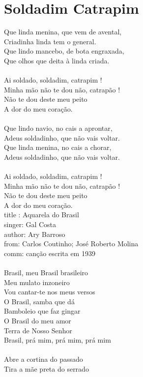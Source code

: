\documentclass{article}
\begin{document}
\section{ Soldadim Catrapim}
Que linda menina, que vem de avental,\\
Criadinha linda tem o general.\\
Que lindo mancebo, de bota engraxada,\\
Que olhos que deita à linda criada.\\
\\
Ai soldado, soldadim, catrapim !\\
Minha mão não te dou não, catrapão !\\
Não te dou deste meu peito\\
A dor do meu coração.\\
\\
Que lindo navio, no cais a aprontar,\\
Adeus soldadinho, que não vais voltar.\\
Que linda menina, no cais a chorar,\\
Adeus soldadinho, que não vais voltar.\\
\\
Ai soldado, soldadim, catrapim !\\
Minha mão não te dou não, catrapão !\\
Não te dou deste meu peito\\
A dor do meu coração.\\
title : Aquarela do Brasil \\
singer: Gal Costa\\
author: Ary Barroso\\
from: Carlos Coutinho; José Roberto Molina\\
comm: canção escrita em 1939 \\
\\
Brasil, meu Brasil brasileiro \\
Meu mulato inzoneiro \\
Vou cantar-te nos meus versos \\
O Brasil, samba que dá \\
Bamboleio que faz gingar \\
O Brasil do meu amor \\
Terra de Nosso Senhor \\
Brasil, prá mim, prá mim, prá mim \\
\\
Abre a cortina do passado \\
Tira a mãe preta do serrado \\
\end{document}
